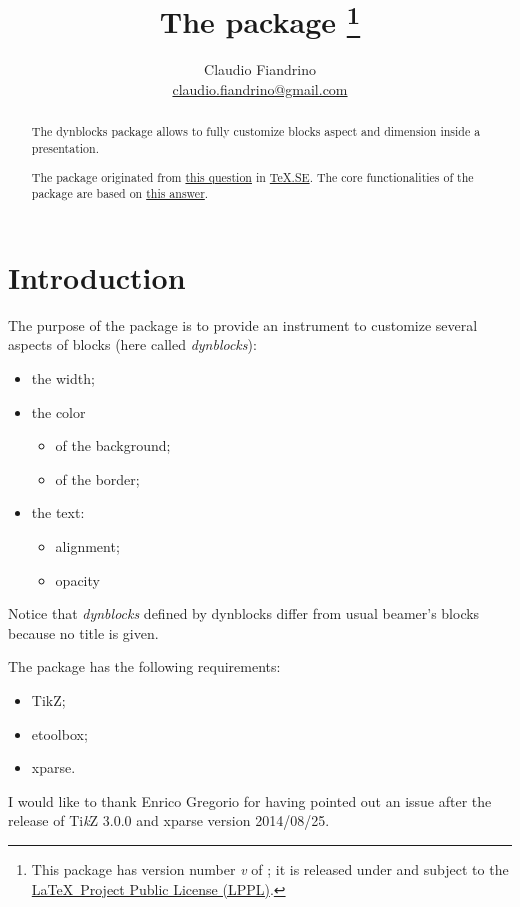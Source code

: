 \documentclass[a4paper,11pt]{article}
\author{Claudio Fiandrino \\ \footnotesize{\href{mailto:claudio.fiandrino@gmail.com}{claudio.fiandrino@gmail.com}}}
\title{The \name{} package \footnote{This package has version number \textit{v}\version{} of \versiondate{}; it is released under and subject to the \href{http://www.latex-project.org/lppl/}{\LaTeX\ Project Public License (LPPL)}.}}
\newcommand{\name}{\textsf{dynblocks}}
\begin{document}
\maketitle
\begin{abstract}
The \name{} package allows to fully customize blocks aspect and dimension inside a presentation.

The package originated from \href{http://tex.stackexchange.com/questions/53784/overlay-images-and-block-in-beamer}{this question} in \href{http://tex.stackexchange.com/}{TeX.SE}. The core functionalities of the package are based on \href{http://tex.stackexchange.com/questions/53784/overlay-images-and-block-in-beamer/53797#53797}{this answer}.
\end{abstract}

\tableofcontents

\section{Introduction}
The purpose of the package is to provide an instrument to customize several aspects of blocks (here called \emph{dynblocks}):
\begin{itemize}
\item the width;
\item the color
\begin{itemize}
\item of the background;
\item of the border;
\end{itemize}
\item the text:
\begin{itemize}
\item alignment;
\item opacity
\end{itemize}
\end{itemize}
Notice that \emph{dynblocks} defined by \name{} differ from usual beamer's blocks because no title is given.

The package has the following requirements:
\begin{itemize}
\item \textsf{TikZ};
\item \textsf{etoolbox};
\item \textsf{xparse}.
\end{itemize}

I would like to thank Enrico Gregorio for having pointed out an issue after the release of Ti\textit{k}Z 3.0.0 and \textsf{xparse} version 2014/08/25.
\end{document}
